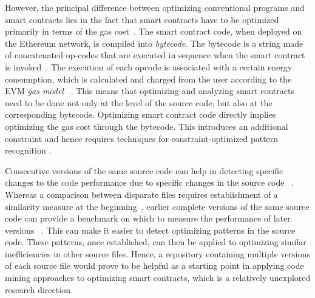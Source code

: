 \documentclass[10pt,conference]{IEEEtran}
\begin{document}
	However, the principal difference between optimizing conventional programs and smart contracts lies in the fact that smart contracts have to be optimized primarily in terms of the gas cost~\cite{superoptimization}. The smart contract code, when deployed on the Ethereum network, is compiled into \textit{bytecode}. The bytecode is a string made of concatenated op-codes that are executed in sequence when the smart contract is invoked~\cite{wood2019ethereum}. The execution of each opcode is associated with a certain energy consumption, which is calculated and charged from the user according to the EVM \textit{gas model} ~\cite{wood2019ethereum}. This means that optimizing and analyzing smart contracts need to be done not only at the level of the source code, but also at the corresponding bytecode. Optimizing smart contract code directly implies optimizing the gas cost through the bytecode. This introduces an additional constraint and hence requires techniques for constraint-optimized pattern recognition \cite{utilitypattern}.
	
	Consecutive versions of the same source code can help in detecting specific changes to the code performance due to specific changes in the source code ~\cite{softwareversion}. Whereas a comparison between disparate files requires establishment of a similarity measure at the beginning~\cite{simsimilarity}, earlier complete versions of the same source code can provide a benchmark on which to measure the performance of later versions ~\cite{softwareversion}. This can make it easier to detect optimizing patterns in the source code. These patterns, once established, can then be applied to optimizing similar inefficiencies in other source files. Hence, a repository containing multiple versions of each source file would prove to be helpful as a starting point in applying code mining approaches to optimizing smart contracts, which is a relatively unexplored research direction.
	
\end{document}
